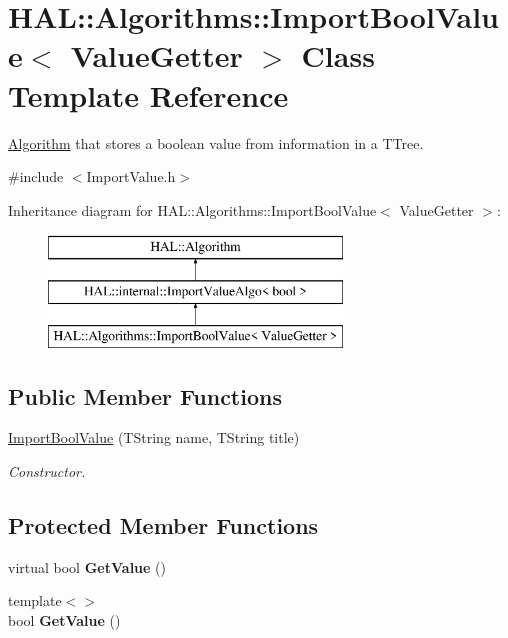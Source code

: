 \hypertarget{class_h_a_l_1_1_algorithms_1_1_import_bool_value}{\section{H\+A\+L\+:\+:Algorithms\+:\+:Import\+Bool\+Value$<$ Value\+Getter $>$ Class Template Reference}
\label{class_h_a_l_1_1_algorithms_1_1_import_bool_value}
}


\hyperlink{class_h_a_l_1_1_algorithm}{Algorithm} that stores a boolean value from information in a T\+Tree.  




{\ttfamily \#include $<$Import\+Value.\+h$>$}

Inheritance diagram for H\+A\+L\+:\+:Algorithms\+:\+:Import\+Bool\+Value$<$ Value\+Getter $>$\+:\begin{figure}[H]
\begin{center}
\leavevmode
\includegraphics[height=3.000000cm]{class_h_a_l_1_1_algorithms_1_1_import_bool_value}
\end{center}
\end{figure}
\subsection*{Public Member Functions}
\begin{DoxyCompactItemize}
\item 
\hyperlink{class_h_a_l_1_1_algorithms_1_1_import_bool_value_a06b77726d1cfcd155fb7e28ee304a917}{Import\+Bool\+Value} (T\+String name, T\+String title)
\begin{DoxyCompactList}\small\item\em Constructor. \end{DoxyCompactList}\end{DoxyCompactItemize}
\subsection*{Protected Member Functions}
\begin{DoxyCompactItemize}
\item 
\hypertarget{class_h_a_l_1_1_algorithms_1_1_import_bool_value_a2d2a95c446cfc0ada77c88abb0079ada}{virtual bool {\bfseries Get\+Value} ()}\label{class_h_a_l_1_1_algorithms_1_1_import_bool_value_a2d2a95c446cfc0ada77c88abb0079ada}

\item 
\hypertarget{class_h_a_l_1_1_algorithms_1_1_import_bool_value_a1c252b82af1631b4a460c2dde78961e5}{{\footnotesize template$<$$>$ }\\bool {\bfseries Get\+Value} ()}\label{class_h_a_l_1_1_algorithms_1_1_import_bool_value_a1c252b82af1631b4a460c2dde78961e5}

\end{DoxyCompactItemize}
